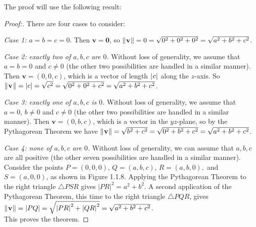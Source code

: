 The proof will use the following result:
\begin{proofbar}\begin{proof}[Proof:]
 There are four cases to consider:
 \par\noindent\emph{Case 1: $a = b = c = 0$}.  
 Then $\mathbf{v} = \mathbf{0}$, so $\lVert\mspace{1mu}\mathbf{v}\mspace{1mu}\rVert
 = 0 = \sqrt{0^2 + 0^2 + 0^2} = \sqrt{a^2 + b^2 + c^2}$.
 \medskip
 \par\noindent\emph{Case 2: exactly two of $a, b, c$ are $0$.}  Without loss of generality, we assume that $a = b = 0$
 and $c \ne 0$ (the other two possibilities are handled in a similar manner).
 Then $\mathbf{v} = (0,0,c)$, which is a vector of length $\lvert\mspace{1mu}c\mspace{1mu}\rvert$ along the $z$-axis.
 So $\lVert\mspace{1mu}\mathbf{v}\mspace{1mu}\rVert = | c | = \sqrt{c^2} = \sqrt{0^2 + 0^2 + c^2} = \sqrt{a^2 + b^2 + c^2}$.
 \medskip
 \par\noindent\emph{Case 3: exactly one of $a, b, c$ is $0$.}  Without loss of generality, we assume that $a = 0$,
 $b \ne 0$ and $c \ne 0$ (the other two possibilities are handled in a similar manner).
 Then $\mathbf{v} = (0,b,c)$, which is a vector in the $yz$-plane, so by the Pythagorean
 Theorem we have $\lVert\mspace{1mu}\mathbf{v}\mspace{1mu}\rVert = \sqrt{b^2 + c^2} = \sqrt{0^2 + b^2 + c^2} =
 \sqrt{a^2 + b^2 + c^2}$.
 \smallskip
 \piccaption[]{}
 \par\noindent\emph{Case 4: none of $a, b, c$ are $0$.}  Without loss of generality, we can assume that
 $a, b, c$ are all positive (the other seven possibilities are handled in a similar manner).
 Consider the points $P = (0,0,0)$, $Q = (a,b,c)$, $R =(a,b,0),$ and $S = (a,0,0)$, as shown in Figure 1.1.8. Applying
 the Pythagorean Theorem to the right triangle $\triangle PSR$ gives $\left\vert PR \right\vert^2 = a^2 + b^2$. A second
 application of the Pythagorean Theorem, this time to the right triangle $\triangle PQR$, gives $\lVert\mspace{1mu}\mathbf{v}\mspace{1mu}\rVert
 = \left\lvert PQ \right\rvert = \sqrt{\left\vert PR \right\vert^2 + \left\vert QR \right\vert^2} =
 \sqrt{a^2 + b^2 + c^2}$.\\
 This proves the theorem. \qquad \qedhere 
\end{proof}\end{proofbar}

